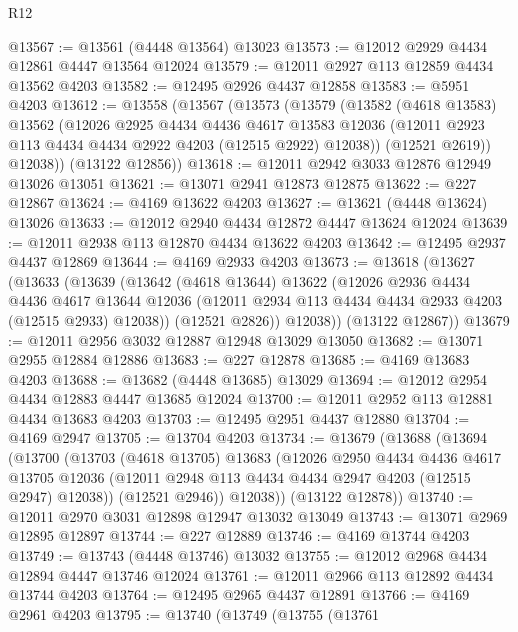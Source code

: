 \begin{lexlean}{R12}
\begin{coremodule}
@13567 := @13561 (@4448 @13564) @13023
@13573 := @12012 @2929 @4434 @12861 @4447 @13564 @12024
@13579 := @12011 @2927 @113 @12859 @4434 @13562 @4203
@13582 := @12495 @2926 @4437 @12858
@13583 := @5951 @4203
@13612 := @13558
    (@13567
      (@13573
        (@13579
          (@13582
            (@4618 @13583)
            @13562
            (@12026
              @2925
              @4434
              @4436
              @4617
              @13583
              @12036
              (@12011 @2923 @113 @4434 @4434 @2922 @4203 (@12515 @2922) @12038))
            (@12521 @2619))
          @12038))
      (@13122 @12856))
@13618 := @12011 @2942 @3033 @12876 @12949 @13026 @13051
@13621 := @13071 @2941 @12873 @12875
@13622 := @227 @12867
@13624 := @4169 @13622 @4203
@13627 := @13621 (@4448 @13624) @13026
@13633 := @12012 @2940 @4434 @12872 @4447 @13624 @12024
@13639 := @12011 @2938 @113 @12870 @4434 @13622 @4203
@13642 := @12495 @2937 @4437 @12869
@13644 := @4169 @2933 @4203
@13673 := @13618
    (@13627
      (@13633
        (@13639
          (@13642
            (@4618 @13644)
            @13622
            (@12026
              @2936
              @4434
              @4436
              @4617
              @13644
              @12036
              (@12011 @2934 @113 @4434 @4434 @2933 @4203 (@12515 @2933) @12038))
            (@12521 @2826))
          @12038))
      (@13122 @12867))
@13679 := @12011 @2956 @3032 @12887 @12948 @13029 @13050
@13682 := @13071 @2955 @12884 @12886
@13683 := @227 @12878
@13685 := @4169 @13683 @4203
@13688 := @13682 (@4448 @13685) @13029
@13694 := @12012 @2954 @4434 @12883 @4447 @13685 @12024
@13700 := @12011 @2952 @113 @12881 @4434 @13683 @4203
@13703 := @12495 @2951 @4437 @12880
@13704 := @4169 @2947
@13705 := @13704 @4203
@13734 := @13679
    (@13688
      (@13694
        (@13700
          (@13703
            (@4618 @13705)
            @13683
            (@12026
              @2950
              @4434
              @4436
              @4617
              @13705
              @12036
              (@12011 @2948 @113 @4434 @4434 @2947 @4203 (@12515 @2947) @12038))
            (@12521 @2946))
          @12038))
      (@13122 @12878))
@13740 := @12011 @2970 @3031 @12898 @12947 @13032 @13049
@13743 := @13071 @2969 @12895 @12897
@13744 := @227 @12889
@13746 := @4169 @13744 @4203
@13749 := @13743 (@4448 @13746) @13032
@13755 := @12012 @2968 @4434 @12894 @4447 @13746 @12024
@13761 := @12011 @2966 @113 @12892 @4434 @13744 @4203
@13764 := @12495 @2965 @4437 @12891
@13766 := @4169 @2961 @4203
@13795 := @13740
    (@13749
      (@13755
        (@13761

\end{coremodule}
\end{lexlean}
